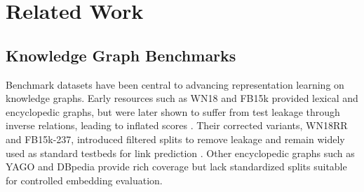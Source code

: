 \documentclass[conference]{IEEEtran}
\begin{document}
%
%


\section{Related Work}

\subsection{Knowledge Graph Benchmarks}
Benchmark datasets have been central to advancing representation learning on knowledge graphs. Early resources such as WN18 and FB15k provided lexical and encyclopedic graphs, but were later shown to suffer from test leakage through inverse relations, leading to inflated scores \cite{bordes_translatingembeddingsmodeling_2013}. Their corrected variants, WN18RR and FB15k-237, introduced filtered splits to remove leakage and remain widely used as standard testbeds for link prediction \cite{dettmers_convolutional2dknowledge_2018, toutanova_observedlatentfeatures_2015}. Other encyclopedic graphs such as YAGO \cite{mahdisoltani_yago3knowledgebase_2015} and DBpedia \cite{auer_dbpedianucleusweb_2007} provide rich coverage but lack standardized splits suitable for controlled embedding evaluation.
\end{document}
